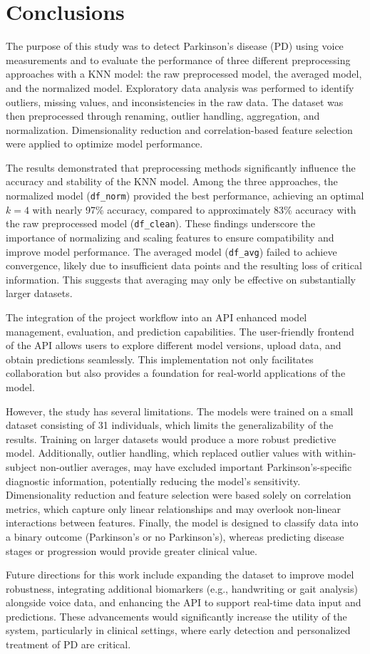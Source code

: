 \section{Conclusions}

The purpose of this study was to detect Parkinson’s disease (PD) using voice
measurements and to evaluate the performance of three different preprocessing
approaches with a KNN model: the raw preprocessed model, the averaged model,
and the normalized model. Exploratory data analysis was performed to identify
outliers, missing values, and inconsistencies in the raw data. The dataset was
then preprocessed through renaming, outlier handling, aggregation, and
normalization. Dimensionality reduction and correlation-based feature selection
were applied to optimize model performance.

The results demonstrated that preprocessing methods significantly influence the
accuracy and stability of the KNN model. Among the three approaches, the
normalized model (\texttt{df\_norm}) provided the best performance, achieving
an optimal \(k = 4\) with nearly 97\% accuracy, compared to approximately 83\%
accuracy with the raw preprocessed model (\texttt{df\_clean}). These findings
underscore the importance of normalizing and scaling features to ensure
compatibility and improve model performance. The averaged model
(\texttt{df\_avg}) failed to achieve convergence, likely due to insufficient
data points and the resulting loss of critical information. This suggests that
averaging may only be effective on substantially larger datasets.

The integration of the project workflow into an API enhanced model management,
evaluation, and prediction capabilities. The user-friendly frontend of the API
allows users to explore different model versions, upload data, and obtain
predictions seamlessly. This implementation not only facilitates collaboration
but also provides a foundation for real-world applications of the model.

However, the study has several limitations. The models were trained on a small
dataset consisting of 31 individuals, which limits the generalizability of the
results. Training on larger datasets would produce a more robust predictive
model. Additionally, outlier handling, which replaced outlier values with
within-subject non-outlier averages, may have excluded important
Parkinson’s-specific diagnostic information, potentially reducing the model’s
sensitivity. Dimensionality reduction and feature selection were based solely
on correlation metrics, which capture only linear relationships and may
overlook non-linear interactions between features. Finally, the model is
designed to classify data into a binary outcome (Parkinson’s or no
Parkinson’s), whereas predicting disease stages or progression would provide
greater clinical value.

Future directions for this work include expanding the dataset to improve model
robustness, integrating additional biomarkers (e.g., handwriting or gait
analysis) alongside voice data, and enhancing the API to support real-time data
input and predictions. These advancements would significantly increase the
utility of the system, particularly in clinical settings, where early detection
and personalized treatment of PD are critical.
